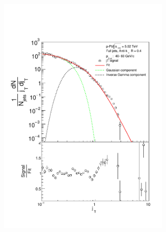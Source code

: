 \begin{figure}
\centering
\begin{subfigure}{0.24\textwidth}
\includegraphics[width=0.95\textwidth]{results/JetConejTSignalFit/JetConejTSignalFitNFin00JetPt04randomBgBayes}
\end{subfigure}
\begin{subfigure}{0.24\textwidth}

\end{subfigure}
\end{figure}
